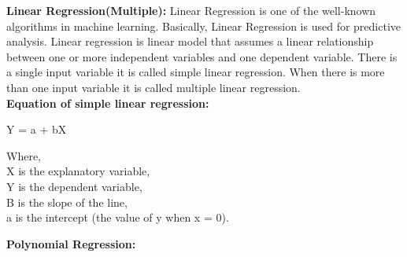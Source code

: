\documentclass[conference]{IEEEtran}[10]
\begin{document}
\textbf{Linear Regression(Multiple):}
Linear Regression is one of the well-known algorithms in machine learning. Basically, Linear Regression is used for predictive analysis. Linear regression is linear model that assumes a linear relationship between one or more independent variables and one dependent variable. There is a single input variable it is called simple linear regression. When there is more than one input variable it is called multiple linear regression.
\\\textbf{Equation of simple linear regression:}
\begin{center}
Y = a + bX
\end{center}
Where,
\\X is the explanatory variable,
\\Y is the dependent variable, 
\\B is the slope of the line,
\\a is the intercept (the value of y when x = 0).

\textbf{Polynomial Regression:}
\end{document}
